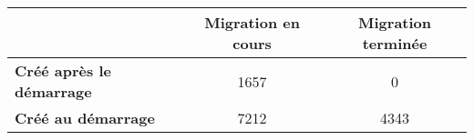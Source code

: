 \begin{tabular}{lcc}
\toprule
{} &  Migration en cours &  Migration terminée \\
\midrule
\textbf{Créé après le démarrage} &                1657 &                   0 \\
\textbf{Créé au démarrage      } &                7212 &                4343 \\
\bottomrule
\end{tabular}
